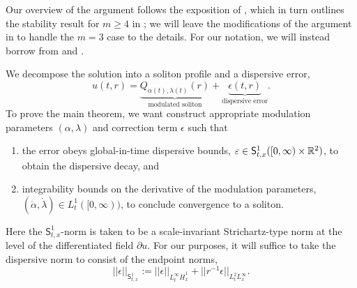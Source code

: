 
Our overview of the argument follows the exposition of \cite{MR2528734}, which in turn outlines the stability result for $m \geq 4$ in \cite{gustafson2007schrodinger}; we will leave the modifications of the argument in \cite{GustafsonEtAl2010} to handle the $m = 3$ case to the details. For our notation, we will instead borrow from \cite[Geometric Wave Equations]{KochEtAl2014} and \cite{BejenaruTataru2014,bejenaru2024near}. 

We decompose the solution into a soliton profile and a dispersive error,
\begin{equation}\label{eq:decomp2}
	u(t, r) = \underbrace{Q_{\alpha(t), \lambda(t)}(r)}_{\text{modulated soliton}}  + \underbrace{\epsilon(t, r)}_{\text{dispersive error}} .
\end{equation}
To prove the main theorem, we want construct appropriate modulation parameters $(\alpha, \lambda)$ and correction term $\epsilon$ such that 
	\begin{enumerate}
		\item the error obeys global-in-time dispersive bounds, $\varepsilon \in \mathsf S_{t, x}^1 ([0, \infty) \times \mathbb R^2)$, to obtain the dispersive decay, and \label{item:goal1}
		
		\item integrability bounds on the derivative of the modulation parameters, $(\dot {\alpha}, \dot{\lambda}) \in L^1_t ([0, \infty))$, to conclude convergence to a soliton. \label{item:goal2}
	\end{enumerate}
Here the $\mathsf S_{t, x}^1$-norm is taken to be a scale-invariant Strichartz-type norm at the level of the differentiated field $\partial u$. For our purposes, it will suffice to take the dispersive norm to consist of the endpoint norms, 
    \[
        ||\epsilon||_{\mathsf S_{t, x}^1} 
            := ||\epsilon||_{L^\infty_t \dot H^1_x} + || r^{-1}\epsilon ||_{L^2_t L^\infty_x}. 
    \]

